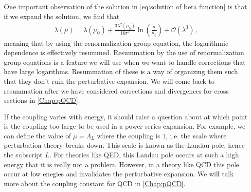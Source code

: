 One important observation of the solution in \cref{eq:solution of beta function} is that if we expand the solution, we find that
\begin{align}\label{eq:coupling solution expanded}
    \lambda(\mu)=\lambda(\mu_{0})+\frac{3\lambda^{2}(\mu_0)}{16\pi^{2}}\ln(\frac{\mu}{\mu_{0}})+\mathcal{O}(\lambda^{3})\,,
\end{align}
meaning that by using the renormalization group equation, the logarithmic dependence is effectively resummed. Resummation by the use of renormalization group equations is a feature we will use when we want to handle corrections that have large logarithms. Resummation of these is a way of organizing them such that they don't ruin the perturbative expansion. We will come back to resummation after we have considered corrections and divergences for cross sections in \cref{Chap:pQCD}.

If the coupling varies with energy, it should raise a question about at which point is the coupling too large to be used in a power series expansion. For example, we can define the value of $\mu=\Lambda_{L}$ where the coupling is $1$, i.e. the scale where perturbation theory breaks down. This scale is known as the Landau pole, hence the subscript $L$. For theories like QED, this Landau pole occurs at such a high energy that it is really not a problem. However, in a theory like QCD this pole occur at low enegies and invalidates the perturbative expansion. We will talk more about the coupling constant for QCD in \cref{Chap:pQCD}.%

%

